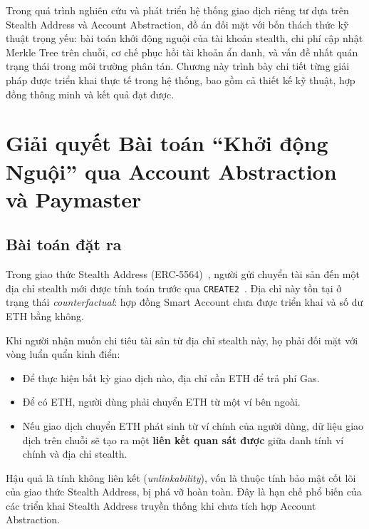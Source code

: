 \documentclass[../DoAn.tex]{subfiles}
\begin{document}
Trong quá trình nghiên cứu và phát triển hệ thống giao dịch riêng tư dựa trên Stealth Address và Account Abstraction, đồ án đối mặt với bốn thách thức kỹ thuật trọng yếu: bài toán khởi động nguội của tài khoản stealth, chi phí cập nhật Merkle Tree trên chuỗi, cơ chế phục hồi tài khoản ẩn danh, và vấn đề nhất quán trạng thái trong môi trường phân tán. Chương này trình bày chi tiết từng giải pháp được triển khai thực tế trong hệ thống, bao gồm cả thiết kế kỹ thuật, hợp đồng thông minh và kết quả đạt được.

\section{Giải quyết Bài toán ``Khởi động Nguội'' qua Account Abstraction và Paymaster}
\label{sec:cold_start}

\subsection{Bài toán đặt ra}
\label{subsec:cold_start_problem}

Trong giao thức Stealth Address (ERC-5564)~\cite{erc5564}, người gửi chuyển tài sản đến một địa chỉ stealth mới được tính toán trước qua \texttt{CREATE2}~\cite{eip1014}. Địa chỉ này tồn tại ở trạng thái \textit{counterfactual}: hợp đồng Smart Account chưa được triển khai và số dư ETH bằng không.

Khi người nhận muốn chi tiêu tài sản từ địa chỉ stealth này, họ phải đối mặt với vòng luẩn quẩn kinh điển:

\begin{itemize}
    \item Để thực hiện bất kỳ giao dịch nào, địa chỉ cần ETH để trả phí Gas.
    \item Để có ETH, người dùng phải chuyển ETH từ một ví bên ngoài.
    \item Nếu giao dịch chuyển ETH phát sinh từ ví chính của người dùng, dữ liệu giao dịch trên chuỗi sẽ tạo ra một \textbf{liên kết quan sát được} giữa danh tính ví chính và địa chỉ stealth.
\end{itemize}

Hậu quả là tính không liên kết (\textit{unlinkability}), vốn là thuộc tính bảo mật cốt lõi của giao thức Stealth Address, bị phá vỡ hoàn toàn. Đây là hạn chế phổ biến của các triển khai Stealth Address truyền thống khi chưa tích hợp Account Abstraction.
\end{document}
